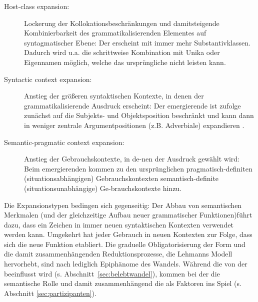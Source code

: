 \begin{description}
\item[Host-class expansion:] Lockerung der Kollokationsbeschränkungen und damit\linebreak steigende Kombinierbarkeit des grammatikalisierenden Elementes auf syntagmatischer Ebene: Der  erscheint mit immer mehr Substantivklassen. Dadurch wird u.a. die schrittweise Kombination mit Unika  oder Eigennamen  möglich, welche das ursprüngliche  nicht leisten kann. 
\item[Syntactic context expansion:] Anstieg  der größeren syntaktischen Kontexte, in denen der grammatikalisierende Ausdruck erscheint: Der emergierende  ist \textcite[32]{Himmelmann2004} zufolge zunächst auf die Subjekts- und Objektsposition  beschränkt und kann dann in weniger zentrale Argumentpositionen (z.B. Adverbiale) expandieren \parencite[s. hierzu auch ausführlich][]{Himmelmann1998}. 
\item[Semantic-pragmatic context expansion:] Anstieg der Gebrauchskontexte, in de-\linebreak nen der Ausdruck gewählt wird: Beim emergierenden  kommen zu den ursprünglichen pragmatisch-definiten (situationsabhängigen) Gebrauchskontexten semantisch-definite (situationsunabhängige) Ge-\linebreak brauchskontexte hinzu. 

 
\end{description}

\noindent
Die Expansionstypen bedingen sich gegenseitig: Der Abbau von semantischen Merkmalen (und der gleichzeitige Aufbau neuer grammatischer Funktionen)\linebreak führt dazu, dass ein Zeichen in immer neuen syntaktischen Kontexten verwendet werden kann. Umgekehrt hat jeder Gebrauch in neuen Kontexten zur Folge, dass sich die neue Funktion etabliert. Die graduelle Obligatorisierung der Form und die damit zusammenhängenden Reduktionsprozesse, die Lehmanns Modell hervorhebt, sind nach \textcite[33]{Himmelmann2004} lediglich Epiphänome des Wandels. Während die  von der   beeinflusst wird (s. Abschnitt~\ref{sec:belebtwandel}), kommen bei der  die semantische Rolle  und damit zusammenhängend die  als Faktoren ins Spiel (s. Abschnitt \ref{sec:partizipanten}).

